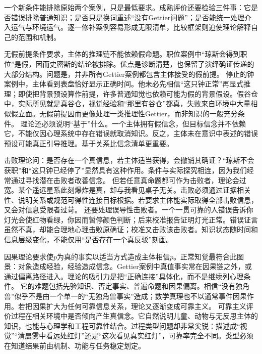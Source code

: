  一个新条件能排除原始两个案例，只是最低要求。成熟评价还要检验三件事：它是否错误排除普通知识；是否只是换词重述“没有Gettier问题”；是否能统一处理介入运气与环境运气。逐一修补案例容易形成无限清单，比较框架则迫使理论解释自己的范围和机制。

无假前提条件要求，主体的推理链不能依赖假命题。职位案例中“琼斯会得到职位”是假，因而史密斯的结论被排除。优点是诊断清楚，也保留了演绎确证传递的大部分结构。问题是，并非所有Gettier案例都包含主体接受的假前提。 停止的钟案例中，主体看到表盘恰好显示正确时间。他未必先相信“这只钟正常”再显式推理；即使把背景预设算作前提，许多普通知觉也依赖可能为假的背景假设。假谷仓中，实际所见就是真谷仓，视觉经验和“那里有谷仓”都真，失败来自环境中大量相似假立面。无假前提因而更像处理一类推理性Gettier，而非知识的一般充分条件。 理论还必须说明“基于”什么。一个主体拥有假信念，但目标信念并不依赖它，不能仅因心理系统中存在错误就取消知识。反之，主体未在意识中表述的错误预设可能真正引导推理。基于关系比信念清单更重要。

击败理论问：是否存在一个真信息，若主体适当获得，会撤销其确证？“琼斯不会获职”和“这只钟已经停了”显然具有这种作用。条件与实际探究相连，因为我们经常通过寻找潜在击败者改善信念。 但若任意真命题都可作为击败者，理论会过宽。某个遥远星系此刻爆炸是真，却与我看见桌子无关。击败必须通过证据相关性、说明关系或规范可得性连接目标根据。若要求主体能实际取得全部击败信息，又会对信息受限者过苛。 还要处理误导性击败者。一个一贯可靠的人错误告诉你灯光会使红物看绿，你因而暂停颜色判断；后来校准报告证明灯光正常。错误证言虽然不真，却能合理地心理击败原确证；校准又击败该击败者。知识状态随时间和信息层级变化，不能仅用“是否存在一个真反驳”刻画。

因果理论要求使$p$为真的事实以适当方式造成主体相信$p$。正常知觉最符合此图景：对象造成经验，经验造成信念。Gettier案例中真值事实常在因果链之外，或通过偏离路径进入。理论的吸引力是把“正确连接”具体化，而不是继续列心理条件。 它的难题包括先验知识、否定事实、普遍命题和因果偏离。相信“没有独角兽”似乎不是由一个单一的“无独角兽事实”造成；数学真理也不以通常事件因果作用。若把因果扩大为任何可靠信息关系，理论又逐渐变成可靠主义。 可靠主义评价过程在相关环境中是否倾向产生真信念\parencite{goldman1979}。它自然说明儿童、动物与无反思主体的知识，也能与心理学和工程可靠性结合。过程类型问题却非常尖锐：描述成“视觉”“清晨雾中看远处红灯”还是“这次看见真实红灯”，可靠率完全不同。类型必须在知道结果前由机制、功能与任务稳定划定。

